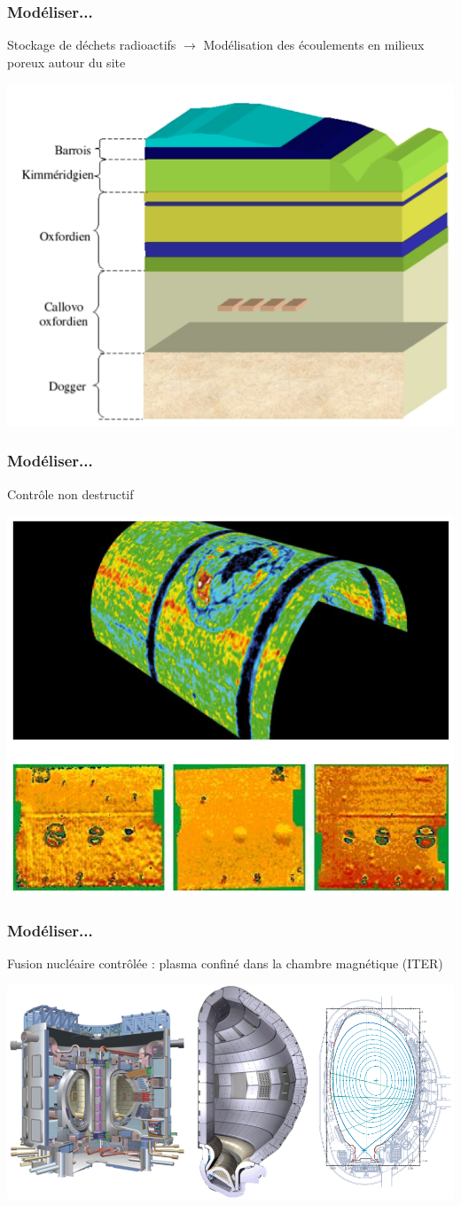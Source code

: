 \documentclass[slideopt,A4]{beamer}
\begin{document}
%
\begin{frame}
\frametitle{Modéliser...}
%
Stockage de déchets radioactifs $\rightarrow$ Modélisation des écoulements en milieux poreux autour du site\\
\centerline{\includegraphics[width=0.8\linewidth]{stockage.png}}
%
\end{frame}
%

%
\begin{frame}
\frametitle{Modéliser...}
%
Contrôle non destructif
%
\centerline{\includegraphics[width=0.75\linewidth]{controle-nondestructif.png}}
%
\end{frame}
%


%
\begin{frame}
\frametitle{Modéliser...}
%
Fusion nucléaire contrôlée : plasma confiné dans la chambre magnétique (ITER)
%
\centerline{\includegraphics[width=0.8\linewidth]{iter.png}}
%
\end{frame}
%
\end{document}
